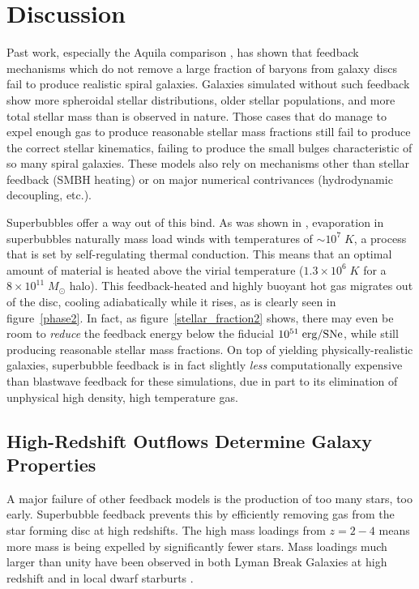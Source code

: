 \section{Discussion}

Past work, especially the Aquila comparison \citep{Scannapieco2012}, has shown
that feedback mechanisms which do not remove a large fraction of baryons from
galaxy discs fail to produce realistic spiral galaxies.  Galaxies simulated
without such feedback show more spheroidal stellar
distributions, older stellar populations, and more total stellar mass than is
observed in nature.  Those cases that do manage to expel enough gas to produce
reasonable stellar mass fractions still fail to produce the correct stellar
kinematics, failing to produce the small bulges characteristic of
so many spiral galaxies.  These models also rely on mechanisms other than
stellar feedback (SMBH heating) or on major numerical contrivances (hydrodynamic
decoupling, etc.).  

Superbubbles offer a way out of this bind. As was shown in \citep{Keller2014},
evaporation in superbubbles naturally mass load winds with temperatures of
$\sim10^7\;K$, a process that is set by self-regulating thermal conduction.
This means that an optimal amount of material is heated above the virial
temperature ($1.3\times10^6\;K$ for a $8\times10^{11}\;M_\odot$ halo).  This
feedback-heated and highly buoyant hot gas migrates out of the disc, cooling
adiabatically while it rises, as is clearly seen in figure~\ref{phase2}.   In
fact, as figure~\ref{stellar_fraction2} shows, there may even be room to {\it
reduce} the feedback energy below the fiducial $10^{51}\;\rm erg/SNe$, while
still producing reasonable stellar mass fractions.  On top of yielding
physically-realistic galaxies, superbubble feedback is in fact slightly
\textit{less} computationally expensive than blastwave feedback for these
simulations, due in part to its elimination of unphysical high density, high
temperature gas.

\subsection{High-Redshift Outflows Determine Galaxy Properties}

A major failure of other feedback models is 
the production of too many stars, too early.  Superbubble feedback prevents this
by efficiently removing gas from the star forming disc at high redshifts.  The
high mass loadings from $z=2-4$ means more mass is being expelled by
significantly fewer stars.  Mass loadings much larger than unity have been
observed in both Lyman Break Galaxies at high redshift \citep{Pettini2002} and
in local dwarf starburts \citep{Martin2002}.  

